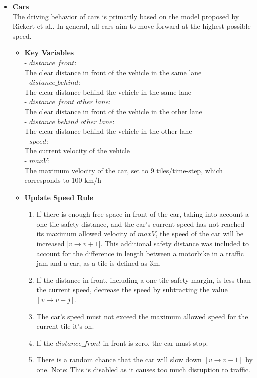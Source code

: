  \begin{itemize}
     \item \textbf{Cars} \\
     The driving behavior of cars is primarily based on the model proposed by Rickert et al.\cite{RICKERT1996534}. In general, all cars aim to move forward at the highest possible speed.
     \begin{itemize}
         \item \textbf{Key Variables} \\
         - $distance\_front$: \\ 
         The clear distance in front of the vehicle in the same lane\\
         - $distance\_behind$: \\ 
         The clear distance behind the vehicle in the same lane\\
         - $distance\_front\_other\_lane$: \\
         The clear distance in front of the vehicle in the other lane\\
         - $distance\_behind\_other\_lane$: \\
         The clear distance behind the vehicle in the other lane\\
         - $speed$: \\
         The current velocity of the vehicle\\
         - $maxV$: \\
         The maximum velocity of the car, set to 9 tiles/time-step, which corresponds to 100 km/h\\
         
         \item \textbf{Update Speed Rule}
         \begin{enumerate}
             \item If there is enough free space in front of the car, taking into account a one-tile safety distance, and the car's current speed has not reached its maximum allowed velocity of $maxV$, the speed of the car will be increased [$v \rightarrow v + 1$]. This additional safety distance was included to account for the difference in length between a motorbike in a traffic jam and a car, as a tile is defined as 3m.
             \item If the distance in front, including a one-tile safety margin, is less than the current speed, decrease the speed by subtracting the value $[v \rightarrow v-j]$.
             \item The car's speed must not exceed the maximum allowed speed for the current tile it's on.
             \item If the $distance\_front$ in front is zero, the car must stop.
             \item There is a random chance that the car will slow down $[v \rightarrow v-1]$ by one. Note: This is disabled as it causes too much disruption to traffic.
         \end{enumerate}
         

\end{itemize}
\end{itemize}
